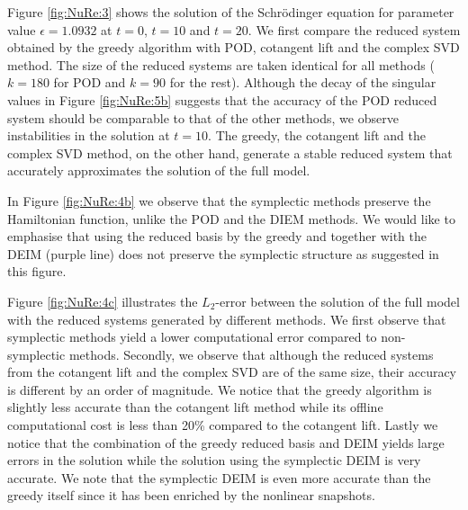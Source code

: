 Figure \ref{fig:NuRe:3} shows the solution of the Schr\"odinger equation for parameter value $\epsilon = 1.0932$ at $t=0$, $t=10$ and $t=20$. We first compare the reduced system obtained by the greedy algorithm with POD, cotangent lift and the complex SVD method. The size of the reduced systems are taken identical for all methods ($k=180$ for POD and $k=90$ for the rest). Although the decay of the singular values in Figure \ref{fig:NuRe:5b} suggests that the accuracy of the POD reduced system should be comparable to that of the other methods, we observe instabilities in the solution at $t=10$. The greedy, the cotangent lift and the complex SVD method, on the other hand, generate a stable reduced system that accurately approximates the solution of the full model.

{\edit In Figure \ref{fig:NuRe:4b} we observe that the symplectic methods preserve the Hamiltonian function, unlike the POD and the DIEM methods. We would like to emphasise that using the reduced basis by the greedy and together with the DEIM (purple line) does not preserve the symplectic structure as suggested in this figure.}

Figure \ref{fig:NuRe:4c} illustrates the $L_2$-error between the solution of the full model with the reduced systems generated by different methods. We first observe that symplectic methods yield a lower computational error compared to non-symplectic methods. Secondly, we observe that although the reduced systems from the cotangent lift and the complex SVD are of the same size, their accuracy is different by an order of magnitude. We notice that the greedy algorithm is slightly less accurate than the cotangent lift method while its offline computational cost is less than 20\% {\edit compared to the cotangent lift}. Lastly we notice that the combination of the greedy reduced basis and DEIM yields large errors in the solution while the solution using the symplectic DEIM is very accurate. We note that the symplectic DEIM is even more accurate than the greedy itself since it has been enriched by the nonlinear snapshots. 

